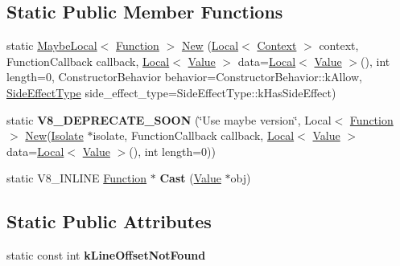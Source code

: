\subsection*{Static Public Member Functions}
\begin{DoxyCompactItemize}
\item 
static \mbox{\hyperlink{classv8_1_1MaybeLocal}{Maybe\+Local}}$<$ \mbox{\hyperlink{classv8_1_1Function}{Function}} $>$ \mbox{\hyperlink{classv8_1_1Function_afc51cb2669c3f8b6035c2a7f813d0040}{New}} (\mbox{\hyperlink{classv8_1_1Local}{Local}}$<$ \mbox{\hyperlink{classv8_1_1Context}{Context}} $>$ context, Function\+Callback callback, \mbox{\hyperlink{classv8_1_1Local}{Local}}$<$ \mbox{\hyperlink{classv8_1_1Value}{Value}} $>$ data=\mbox{\hyperlink{classv8_1_1Local}{Local}}$<$ \mbox{\hyperlink{classv8_1_1Value}{Value}} $>$(), int length=0, Constructor\+Behavior behavior=Constructor\+Behavior\+::k\+Allow, \mbox{\hyperlink{namespacev8_a29711319c2b9fc7716d65faee2f7b9cb}{Side\+Effect\+Type}} side\+\_\+effect\+\_\+type=Side\+Effect\+Type\+::k\+Has\+Side\+Effect)
\item 
\mbox{\label{classv8_1_1Function_aa209acdf0cdc4ba1cbc5c74d44696529}} 
static {\bfseries V8\+\_\+\+D\+E\+P\+R\+E\+C\+A\+T\+E\+\_\+\+S\+O\+ON} (\char`\"{}Use maybe version\char`\"{}, Local$<$ \mbox{\hyperlink{classv8_1_1Function}{Function}} $>$ \mbox{\hyperlink{classv8_1_1Function_afc51cb2669c3f8b6035c2a7f813d0040}{New}}(\mbox{\hyperlink{classv8_1_1Isolate}{Isolate}} $\ast$isolate, Function\+Callback callback, \mbox{\hyperlink{classv8_1_1Local}{Local}}$<$ \mbox{\hyperlink{classv8_1_1Value}{Value}} $>$ data=\mbox{\hyperlink{classv8_1_1Local}{Local}}$<$ \mbox{\hyperlink{classv8_1_1Value}{Value}} $>$(), int length=0))
\item 
\mbox{\label{classv8_1_1Function_af24f38bcc0769519816cda1f6a154ff8}} 
static V8\+\_\+\+I\+N\+L\+I\+NE \mbox{\hyperlink{classv8_1_1Function}{Function}} $\ast$ {\bfseries Cast} (\mbox{\hyperlink{classv8_1_1Value}{Value}} $\ast$obj)
\end{DoxyCompactItemize}
\subsection*{Static Public Attributes}
\begin{DoxyCompactItemize}
\item 
\mbox{\label{classv8_1_1Function_acf0af24f79908e405a6ac435277596d9}} 
static const int {\bfseries k\+Line\+Offset\+Not\+Found}
\end{DoxyCompactItemize}


